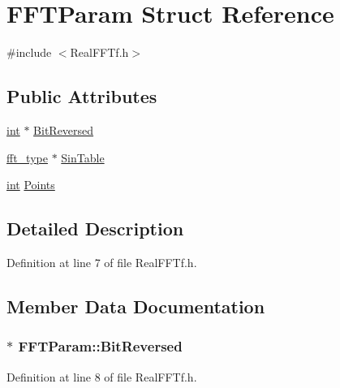 \hypertarget{struct_f_f_t_param}{}\section{F\+F\+T\+Param Struct Reference}
\label{struct_f_f_t_param}


{\ttfamily \#include $<$Real\+F\+F\+Tf.\+h$>$}

\subsection*{Public Attributes}
\begin{DoxyCompactItemize}
\item 
\hyperlink{xmltok_8h_a5a0d4a5641ce434f1d23533f2b2e6653}{int} $\ast$ \hyperlink{struct_f_f_t_param_a2dbb35052a4a8d023a83decfc8d97c8a}{Bit\+Reversed}
\item 
\hyperlink{_real_f_f_tf48x_8h_aa463c67230ad03d3fa9ad549d4704bbb}{fft\+\_\+type} $\ast$ \hyperlink{struct_f_f_t_param_a31cb8421cbc35c7071687691afc60c25}{Sin\+Table}
\item 
\hyperlink{xmltok_8h_a5a0d4a5641ce434f1d23533f2b2e6653}{int} \hyperlink{struct_f_f_t_param_a8d68cf80507059c2372ff865c1a6e665}{Points}
\end{DoxyCompactItemize}


\subsection{Detailed Description}


Definition at line 7 of file Real\+F\+F\+Tf.\+h.



\subsection{Member Data Documentation}
\subsubsection[{\texorpdfstring{Bit\+Reversed}{BitReversed}}]{$\ast$ F\+F\+T\+Param\+::\+Bit\+Reversed}\hypertarget{struct_f_f_t_param_a2dbb35052a4a8d023a83decfc8d97c8a}{}\label{struct_f_f_t_param_a2dbb35052a4a8d023a83decfc8d97c8a}


Definition at line 8 of file Real\+F\+F\+Tf.\+h.

